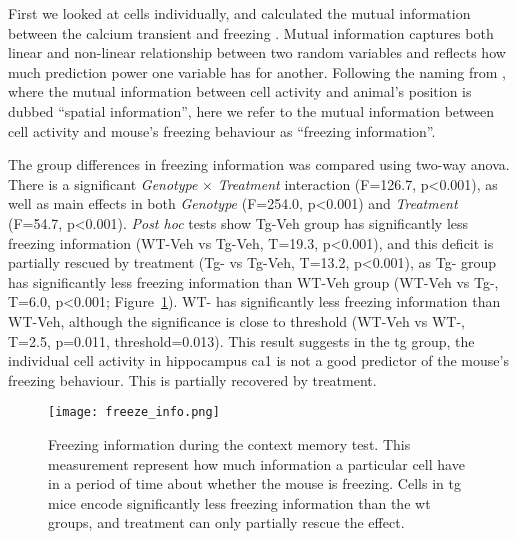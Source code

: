 First we looked at cells individually, and calculated the mutual information between the calcium transient and freezing \citep{ross14, victor02}. Mutual information captures both linear and non-linear relationship between two random variables and reflects how much prediction power one variable has for another. Following the naming from \citet{skaggs93}, where the mutual information between cell activity and animal's position is dubbed ``spatial information'', here we refer to the mutual information between cell activity and mouse's freezing behaviour as ``freezing information''. 

The group differences in freezing information was compared using two-way \gls{anova}. There is a significant \textit{Genotype} $\times$ \textit{Treatment} interaction (F=126.7, p<0.001), as well as main effects in both \textit{Genotype} (F=254.0, p<0.001) and \textit{Treatment} (F=54.7, p<0.001). \textit{Post hoc} tests show Tg-Veh group has significantly less freezing information (WT-Veh vs Tg-Veh, T=19.3, p<0.001), and this deficit is partially rescued by \tglu{} treatment (Tg-\glu{} vs Tg-Veh, T=13.2, p<0.001), as Tg-\glu{} group has significantly less freezing information than WT-Veh group (WT-Veh vs Tg-\glu, T=6.0, p<0.001; Figure~\ref{f.ad.freeze_info}). WT-\glu{} has significantly less freezing information than WT-Veh, although the significance is close to threshold (WT-Veh vs WT-\glu, T=2.5, p=0.011, threshold=0.013). This result suggests in the \gls{tg} group, the individual cell activity in hippocampus \gls{ca1} is not a good predictor of the mouse's freezing behaviour. This is partially recovered by \tglu{} treatment. 
\begin{figure}[h]
    \texttt{[image: freeze\_info.png]}
    \caption[Freezing information during memory test.]{Freezing information during the context memory test. This measurement represent how much information a particular cell have in a period of time about whether the mouse is freezing. Cells in \gls{tg} mice encode significantly less freezing information than the \gls{wt} groups, and \tglu{} treatment can only partially rescue the effect. \label{f.ad.freeze_info}}
\end{figure}
    


